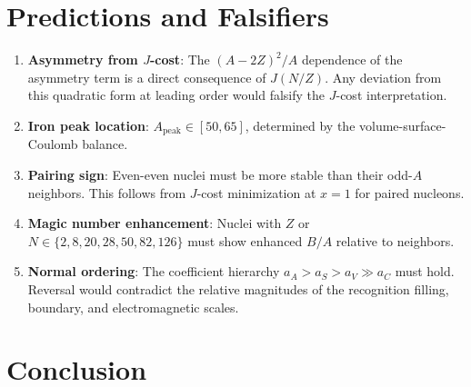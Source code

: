 \documentclass[12pt,a4paper]{article}
\theoremstyle{definition}
\theoremstyle{remark}
\begin{document}
\section{Predictions and Falsifiers}
\label{sec:falsifiers}

\begin{enumerate}[label=(\roman*)]
  \item \textbf{Asymmetry from $J$-cost}: The $(A-2Z)^2/A$
  dependence of the asymmetry term is a direct consequence of
  $J(N/Z)$.  Any deviation from this quadratic form at
  leading order would falsify the $J$-cost interpretation.

  \item \textbf{Iron peak location}: $A_{\mathrm{peak}} \in
  [50, 65]$, determined by the volume-surface-Coulomb balance.

  \item \textbf{Pairing sign}: Even-even nuclei must be more
  stable than their odd-$A$ neighbors.  This follows from
  $J$-cost minimization at $x = 1$ for paired nucleons.

  \item \textbf{Magic number enhancement}: Nuclei with
  $Z$ or $N \in \{2, 8, 20, 28, 50, 82, 126\}$ must show
  enhanced $B/A$ relative to neighbors.

  \item \textbf{Normal ordering}: The coefficient hierarchy
  $a_A > a_S > a_V \gg a_C$ must hold.  Reversal would
  contradict the relative magnitudes of the recognition
  filling, boundary, and electromagnetic scales.
\end{enumerate}

\section{Conclusion}
\label{sec:conclusion}
\end{document}
